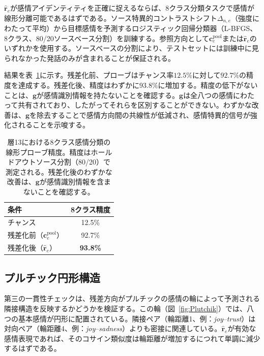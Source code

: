$\hat{\mathbf{r}}_e$が感情アイデンティティを正確に捉えるならば、8クラス分類タスクで感情が線形分離可能であるはずである。ソース特異的コントラストシフト$\Delta_{n,e}$（強度にわたって平均）から目標感情を予測するロジスティック回帰分類器（L-BFGS、8クラス、80/20ソースベース分割）を訓練する。参照方向として$\mathbf{c}^{\mathrm{pool}}_e$または$\hat{\mathbf{r}}_e$のいずれかを使用する。ソースベースの分割により、テストセットには訓練中に見られなかった発話のみが含まれることが保証される。\par

結果を表~\ref{tab:linear_probe_accuracy}に示す。残差化前、プローブはチャンス率$12.5\%$に対して$92.7\%$の精度を達成する。残差化後、精度はわずかに$93.8\%$に増加する。精度の低下がないことは、$\mathbf{g}$が感情識別情報を持たないことを確認する。$\mathbf{g}$は全八つの感情にわたって共有されており、したがってそれらを区別することができない。わずかな改善は、$\mathbf{g}$を除去することで感情方向間の共線性が低減され、感情特異的信号が強化されることを示唆する。\par

\begin{table}[H]
\centering
\small
\begin{tabular}{lc}
\toprule
\textbf{条件} & \textbf{8クラス精度} \\
\midrule
チャンス & 12.5\% \\
残差化前（$\mathbf{c}^{\mathrm{pool}}_e$） & 92.7\% \\
残差化後（$\hat{\mathbf{r}}_e$） & \textbf{93.8\%} \\
\bottomrule
\end{tabular}
\caption{層13における8クラス感情分類の線形プローブ精度。精度はホールドアウトソース分割（80/20）で測定される。残差化後のわずかな改善は、$\mathbf{g}$が感情識別情報を含まないことを確認する。}
\label{tab:linear_probe_accuracy}
\end{table}

\subsection{プルチック円形構造}

第三の一貫性チェックは、残差方向がプルチックの感情の輪によって予測される隣接構造を反映するかどうかを検証する。この輪（図~\ref{fig:Plutchik}）では、八つの基本感情が円形に配置されている。隣接ペア（輪距離1、例：\textit{joy}--\textit{trust}）は対向ペア（輪距離4、例：\textit{joy}--\textit{sadness}）よりも密接に関連している。$\hat{\mathbf{r}}_e$が有効な感情表現であれば、そのコサイン類似度は輪距離が増加するにつれて単調に減少するはずである。\par

